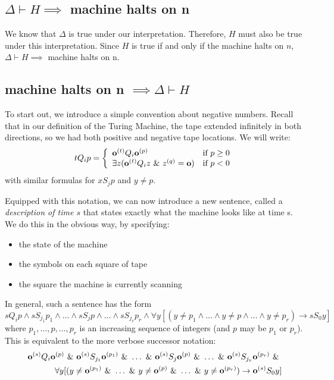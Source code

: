 \subsection{$\Delta \vdash H \implies$ machine halts on n}

We know that $\Delta$ is true under our interpretation.  Therefore, $H$ must also be true under this interpretation.
Since $H$ is true if and only if the machine halts on $n$, $\Delta \vdash H \implies$ machine halts on n.

\subsection{machine halts on n $\implies \Delta \vdash H$}

To start out, we introduce a simple convention about negative numbers. Recall that in our definition of the Turing Machine, the tape extended infinitely in both directions, so we had both positive and negative tape locations. We will write:
\[tQ_ip = \left\{\begin{array}{ll} 
    \mathbf{o}^{(t)}Q_i\mathbf{o}^{(p)} & \text{if }p \ge 0 \\ 
    \exists z (\mathbf{o}^{(t)}Q_iz ~\&~ z^{(q)} = \mathbf{o}) & \text{if } p < 0
 \end{array}\right.\]
with similar formulas for $xS_jp$ and $y \ne p$.

Equipped with this notation, we can now introduce a new sentence, called a \textit{description of time $s$} that states exactly what the machine looks like at time s. We do this in the obvious way, by specifying:
\begin{itemize}
\item the state of the machine
\item the symbols on each square of tape
\item the square the machine is currently scanning
\end{itemize}
In general, such a sentence has the form
\begin{equation}\label{descAtTime}
sQ_ip \land s S_{j_1} p_1 \land \dots\land s S_j p \land \dots \land s S_{j_v}p_r \land 
\forall y[(y\ne p_1\land\dots\land y\ne p \land \dots \land y\ne p_r ) \rightarrow s S_0y]
\end{equation}
where $p_1, \dots , p, \dots, p_r$ is an increasing sequence of integers (and $p$ may be $p_1$ or $p_r$). This is equivalent to the more verbose successor notation:
\begin{eqnarray}
\mathbf{o}^{(s)}Q_i\mathbf{o}^{(p)} ~\&~ \mathbf{o}^{(s)} S_{j_1} \mathbf{o}^{(p_1)} ~\&~ \dots~\&~ \mathbf{o}^{(s)} S_j \mathbf{o}^{(p)} ~\&~ \dots ~\&~ \mathbf{o}^{(s)} S_{j_v}\mathbf{o}^{(p_r)} ~\&~ \\
\forall y[(y\ne \mathbf{o}^{(p_1)}~\&~\dots~\&~ y\ne \mathbf{o}^{(p)} ~\&~ \dots ~\&~ y\ne \mathbf{o}^{(p_r)} ) \rightarrow \mathbf{o}^{(s)} S_0y] \nonumber
\end{eqnarray}

